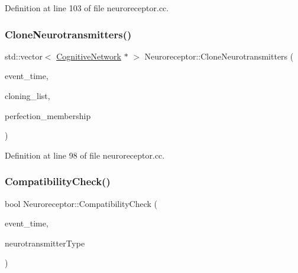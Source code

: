 Definition at line 103 of file neuroreceptor.\+cc.

\mbox{\label{class_neuroreceptor_af953abb478f4a3a1843b4b61f9969274}} 
\subsubsection{\texorpdfstring{Clone\+Neurotransmitters()}{CloneNeurotransmitters()}}
{\footnotesize\ttfamily std\+::vector$<$ \mbox{\hyperlink{class_cognitive_network}{Cognitive\+Network}} $\ast$ $>$ Neuroreceptor\+::\+Clone\+Neurotransmitters (\begin{DoxyParamCaption}\item[{std\+::chrono\+::time\+\_\+point$<$ \mbox{\hyperlink{universe_8h_a0ef8d951d1ca5ab3cfaf7ab4c7a6fd80}{Clock}} $>$}]{event\+\_\+time,  }\item[{std\+::vector$<$ \mbox{\hyperlink{class_cognitive_network}{Cognitive\+Network}} $\ast$$>$}]{cloning\+\_\+list,  }\item[{double}]{perfection\+\_\+membership }\end{DoxyParamCaption})}



Definition at line 98 of file neuroreceptor.\+cc.

\mbox{\label{class_neuroreceptor_a5d54ca353f0be78522aacc4fca06db63}} 
\subsubsection{\texorpdfstring{Compatibility\+Check()}{CompatibilityCheck()}}
{\footnotesize\ttfamily bool Neuroreceptor\+::\+Compatibility\+Check (\begin{DoxyParamCaption}\item[{std\+::chrono\+::time\+\_\+point$<$ \mbox{\hyperlink{universe_8h_a0ef8d951d1ca5ab3cfaf7ab4c7a6fd80}{Clock}} $>$}]{event\+\_\+time,  }\item[{int}]{neurotransmitter\+Type }\end{DoxyParamCaption})}



